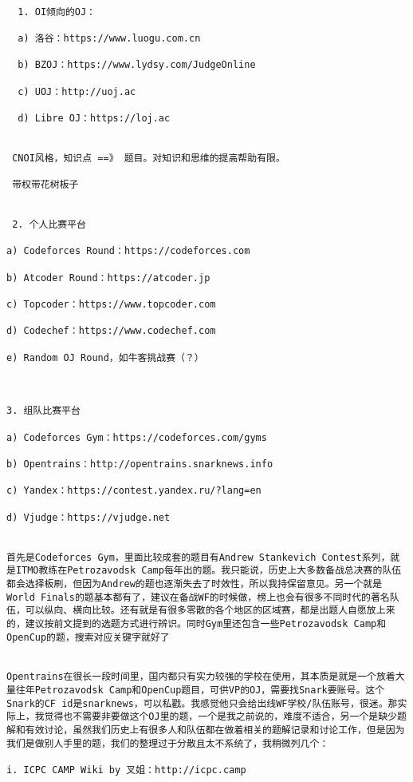 \documentclass[UTF8]{../computerUniverse}
\begin{document}
\begin{lstlisting}

  1. OI倾向的OJ：

  a) 洛谷：https://www.luogu.com.cn
  
  b) BZOJ：https://www.lydsy.com/JudgeOnline
  
  c) UOJ：http://uoj.ac
  
  d) Libre OJ：https://loj.ac


 CNOI风格，知识点 ==》 题目。对知识和思维的提高帮助有限。
 
 带权带花树板子


 2. 个人比赛平台

a) Codeforces Round：https://codeforces.com

b) Atcoder Round：https://atcoder.jp

c) Topcoder：https://www.topcoder.com

d) Codechef：https://www.codechef.com

e) Random OJ Round，如牛客挑战赛（？）



3. 组队比赛平台

a) Codeforces Gym：https://codeforces.com/gyms

b) Opentrains：http://opentrains.snarknews.info

c) Yandex：https://contest.yandex.ru/?lang=en

d) Vjudge：https://vjudge.net


首先是Codeforces Gym，里面比较成套的题目有Andrew Stankevich Contest系列，就是ITMO教练在Petrozavodsk Camp每年出的题。我只能说，历史上大多数备战总决赛的队伍都会选择板刷，但因为Andrew的题也逐渐失去了时效性，所以我持保留意见。另一个就是World Finals的题基本都有了，建议在备战WF的时候做，榜上也会有很多不同时代的著名队伍，可以纵向、横向比较。还有就是有很多零散的各个地区的区域赛，都是出题人自愿放上来的，建议按前文提到的选题方式进行辨识。同时Gym里还包含一些Petrozavodsk Camp和OpenCup的题，搜索对应关键字就好了


Opentrains在很长一段时间里，国内都只有实力较强的学校在使用，其本质是就是一个放着大量往年Petrozavodsk Camp和OpenCup题目，可供VP的OJ，需要找Snark要账号。这个Snark的CF id是snarknews，可以私戳。我感觉他只会给出线WF学校/队伍账号，很迷。那实际上，我觉得也不需要非要做这个OJ里的题，一个是我之前说的，难度不适合，另一个是缺少题解和有效讨论，虽然我们历史上有很多人和队伍都在做着相关的题解记录和讨论工作，但是因为我们是做别人手里的题，我们的整理过于分散且太不系统了，我稍微列几个：

i. ICPC CAMP Wiki by 叉姐：http://icpc.camp


\end{lstlisting}
\end{document}

